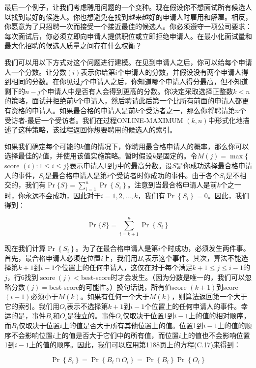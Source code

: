 \documentclass[lang=cn,newtx,10pt,scheme=chinese]{elegantbook}
\begin{document}
最后一个例子，让我们考虑聘用问题的一个变种。现在假设你不想面试所有候选人以找到最好的候选人。你也想避免在找到越来越好的申请人时雇用和解雇。相反，你愿意为了只招聘一次而接受一个接近最佳的候选人。你必须遵守一项公司要求：每次面试后，你必须立即向申请人提供职位或立即拒绝申请人。在最小化面试量和最大化招聘的候选人质量之间存在什么权衡？

我们可以用以下方式对这个问题进行建模。在见到申请人之后，你可以给每个申请人一个分数。让分数$(i)$表示你给第$i$个申请人的分数，并假设没有两个申请人得到相同的分数。在你见过$j$个申请人之后，你知道哪个申请人得分最高，但不知道剩下的$n-j$个申请人中是否有人会得到更高的分数。你决定采取选择正整数$k<n$的策略，面试并拒绝前$k$个申请人，然后聘请此后第一个比所有前面的申请人都更有资格的申请人。如果最合格的申请人是前$k$个受访者之一，那么你将聘请第$n$个受访者-最后一个受访者。我们在过程ONLINE-MAXIMUM $(k, n)$中形式化地描述了这种策略，该过程返回你想要聘用的候选人的索引。

如果我们确定每个可能的$k$值的情况下，你聘用最合格申请人的概率，那么你可以选择最佳的$k$值，并使用该值实施策略。暂时假设$k$是固定的。令$M(j)=\max \{$ score $(i): 1 \leq i \leq j\}$表示申请人1到$j$中的最高分数。设$S$是你成功选择最合格申请人的事件，$S_i$是最合格申请人是第$i$个受访者时你成功的事件。由于各个$S_i$是不相交的，我们有$\operatorname{Pr}\{S\}=\sum_{i=1}^n \operatorname{Pr}\left\{S_i\right\}$。注意到当最合格申请人是前$k$个之一时，你永远不会成功，因此对于$i=1,2, \ldots, k$，我们有$\operatorname{Pr}\left\{S_i\right\}=0$。因此，我们得到：

$$
\operatorname{Pr}\{S\}=\sum_{i=k+1}^n \operatorname{Pr}\left\{S_i\right\}
$$

现在我们计算$\operatorname{Pr}\left\{S_i\right\}$。为了在最合格申请人是第$i$个时成功，必须发生两件事。首先，最合格申请人必须在位置$i$上，我们用$B_i$表示这个事件。其次，算法不能选择第$k+1$到$i-1$个位置上的任何申请人，这仅在对于每个满足$k+1 \leq j \leq i-1$的$j$，行6找到$\operatorname{score}(j)<$best-score时才会发生。（因为分数是唯一的，我们可以忽略分数$(j)=$best-score的可能性。）换句话说，所有值score $(k+1)$到score $(i-1)$必须小于$M(k)$。如果有任何一个大于$M(k)$，则算法返回第一个大于它的索引。我们用$O_i$表示不选择第$k+1$到$i-1$个位置上的任何申请人的事件。幸运的是，事件$B_i$和$O_i$是独立的。事件$O_i$仅取决于位置1到$i-1$上的值的相对顺序，而$B_i$仅取决于位置$i$上的值是否大于所有其他位置上的值。位置1到$i-1$上的值的顺序不会影响位置$i$上的值是否大于它们中的所有值，而位置$i$上的值也不会影响位置1到$i-1$上的值的顺序。因此，我们可以应用第1188页上的方程(C.17)来得到：

$$
\operatorname{Pr}\left\{S_i\right\}=\operatorname{Pr}\left\{B_i \cap O_i\right\}=\operatorname{Pr}\left\{B_i\right\} \operatorname{Pr}\left\{O_i\right\}
$$
\end{document}
